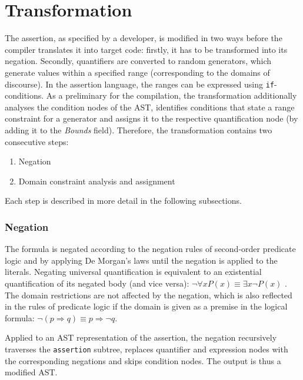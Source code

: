 \section{Transformation}\label{sec:transformation}
The assertion, as specified by a developer, is modified in two ways before the compiler translates it into target code: firstly, it has to be transformed into its negation. Secondly, quantifiers are converted to random generators, which generate values within a specified range (corresponding to the domains of discourse). In the assertion language, the ranges can be expressed using \texttt{if}-conditions. As a preliminary for the compilation, the transformation additionally analyses the condition nodes of the AST, identifies conditions that state a range constraint for a generator and assigns it to the respective quantification node (by adding it to the \textit{Bounds} field). Therefore, the transformation contains two consecutive steps:
\begin{enumerate}
\itemsep-0.5em
\item Negation
\item Domain constraint analysis and assignment
\end{enumerate}
Each step is described in more detail in the following subsections.

\subsubsection{Negation}
The formula is negated according to the negation rules of second-order predicate logic and by applying De Morgan's laws \cite{de_morgan} until the negation is applied to the literals. Negating universal quantification is equivalent to an existential quantification of its negated body (and vice versa): $\neg \forall x P(x) \equiv \exists x \neg P(x)$ \cite{Sundstrom2020Quantifiers}. The domain restrictions are not affected by the negation, which is also reflected in the rules of predicate logic if the domain is given as a premise in the logical formula: $\neg (p \Rightarrow q) \equiv p \Rightarrow \neg q $.

Applied to an AST representation of the assertion, the negation recursively traverses the \texttt{assertion} subtree, replaces quantifier and expression nodes with the corresponding negations and skips condition nodes. The output is thus a modified AST. 

